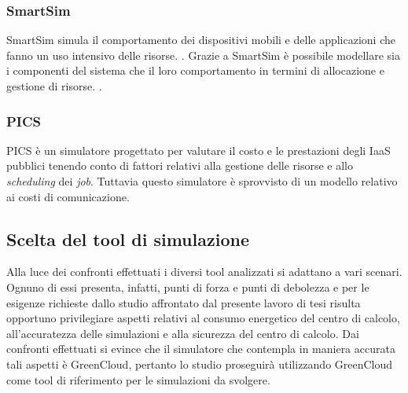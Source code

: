 {\subsubsection{SmartSim}
SmartSim \cite{shiraz2012extendable} simula il comportamento dei dispositivi mobili e delle applicazioni che fanno un uso intensivo delle risorse. \cite{khalil2017cloud}. Grazie a SmartSim è possibile modellare sia i componenti del sistema che il loro comportamento in termini di allocazione e gestione di risorse. \cite{suryateja2016comparative}.
\subsubsection{PICS}
PICS \cite{kim2015pics} è un simulatore progettato per valutare il costo e le prestazioni degli IaaS pubblici tenendo conto di fattori relativi alla gestione delle risorse e allo \emph{scheduling} dei \emph{job}. Tuttavia questo simulatore è sprovvisto di un modello relativo ai costi di comunicazione. \cite{suryateja2016comparative}
\subsection{Scelta del tool di simulazione}
Alla luce dei confronti effettuati i diversi tool analizzati si adattano a vari scenari. Ognuno di essi presenta, infatti, punti di forza e punti di debolezza e per le esigenze richieste dallo studio affrontato dal presente lavoro di tesi risulta opportuno privilegiare aspetti relativi al consumo energetico del centro di calcolo, all'accuratezza delle simulazioni e alla sicurezza del centro di calcolo. Dai confronti effettuati si evince che il simulatore che contempla in maniera accurata tali aspetti è GreenCloud, pertanto lo studio proseguirà utilizzando GreenCloud come tool di riferimento per le simulazioni da svolgere. 

}
